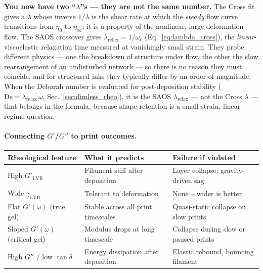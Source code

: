 \documentclass[11pt,a4paper]{article}
\newcommand{\De}{\mathrm{De}}
\begin{document}
\begin{goingdeeperbox}
\textbf{You now have two ``$\lambda$''s --- they are not the same number.}
The Cross fit gives a $\lambda$ whose inverse $1/\lambda$ is the shear rate
at which the \emph{steady} flow curve transitions from $\eta_0$ to
$\eta_\infty$; it is a property of the nonlinear, large-deformation flow.
The SAOS crossover gives $\lambda_\mathrm{relax}=1/\omega_c$
(Eq.~\ref{eq:lambda_cross}), the \emph{linear}-viscoelastic relaxation time
measured at vanishingly small strain. They probe different physics --- one
the breakdown of structure under flow, the other the slow rearrangement of
an undisturbed network --- so there is no reason they must coincide, and
for structured inks they typically differ by an order of magnitude. When
the Deborah number is evaluated for post-deposition stability
($\De=\lambda_\mathrm{relax}\,\omega$, Sec.~\ref{sec:dimless_rheo}), it is
the SAOS $\lambda_\mathrm{relax}$ --- not the Cross $\lambda$ --- that
belongs in the formula, because shape retention is a small-strain,
linear-regime question.
\end{goingdeeperbox}

\paragraph{Connecting $G'$/$G''$ to print outcomes.}

\begin{center}
\small
\begin{tabular}{p{3.5cm} p{4.5cm} p{5.5cm}}
\toprule
\textbf{Rheological feature} & \textbf{What it predicts} & \textbf{Failure if violated} \\
\midrule
High $G'_\mathrm{LVR}$ & Filament stiff after deposition & Layer collapse; gravity-driven sag \\
Wide $\gamma_\mathrm{LVR}$ & Tolerant to deformation & None -- wider is better \\
Flat $G'(\omega)$ (true gel) & Stable across all print timescales & Quasi-static collapse on slow prints \\
Sloped $G'(\omega)$ (critical gel) & Modulus drops at long timescale & Collapse during slow or paused prints \\
High $G''$ / low $\tan\delta$ & Energy dissipation after deposition & Elastic rebound, bouncing filament \\
\bottomrule
\end{tabular}
\end{center}
\end{document}
